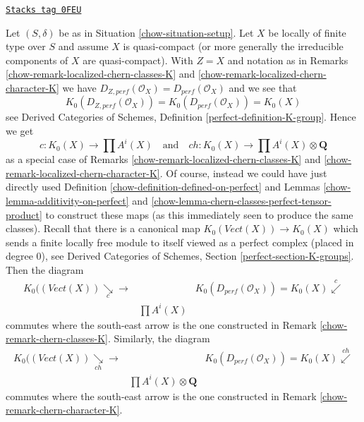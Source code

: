 \begin{remark}
\label{chow-remark-chern-classes-agree}
\href{https://stacks.math.columbia.edu/tag/0FEU}{\texttt{Stacks tag 0FEU}}

Let $(S, \delta)$ be as in Situation \ref{chow-situation-setup}.
Let $X$ be locally of finite type over $S$ and assume $X$
is quasi-compact (or more generally the irreducible components
of $X$ are quasi-compact). With $Z = X$ and notation as in
Remarks \ref{chow-remark-localized-chern-classes-K} and
\ref{chow-remark-localized-chern-character-K}
we have $D_{Z, perf}(\mathcal{O}_X) = D_{perf}(\mathcal{O}_X)$
and we see that
$$
K_0(D_{Z, perf}(\mathcal{O}_X)) = K_0(D_{perf}(\mathcal{O}_X)) = K_0(X)
$$
see
Derived Categories of Schemes, Definition \ref{perfect-definition-K-group}.
Hence we get
$$
c : K_0(X) \to \prod A^i(X)
\quad\text{and}\quad
ch : K_0(X) \to \prod A^i(X) \otimes \mathbf{Q}
$$
as a special case of Remarks \ref{chow-remark-localized-chern-classes-K} and
\ref{chow-remark-localized-chern-character-K}. Of course, instead we could
have just directly used Definition \ref{chow-definition-defined-on-perfect} and
Lemmas \ref{chow-lemma-additivity-on-perfect} and
\ref{chow-lemma-chern-classes-perfect-tensor-product} to construct these maps
(as this immediately seen to produce the same classes).
Recall that there is a canonical map $K_0(\textit{Vect}(X)) \to K_0(X)$
which sends a finite locally free module to itself viewed
as a perfect complex (placed in degree $0$), see
Derived Categories of Schemes, Section \ref{perfect-section-K-groups}.
Then the diagram
$$
\begin{array}{ccc}K_0((\textit{Vect}(X)) \underset{c}{\searrow}\longrightarrow &  & K_0(D_{perf}(\mathcal{O}_X)) = K_0(X) \overset{c}{\swarrow} \\  & \prod A^i(X) & \end{array}
$$
commutes where the south-east arrow is the one constructed in
Remark \ref{chow-remark-chern-classes-K}. Similarly, the diagram
$$
\begin{array}{ccc}K_0((\textit{Vect}(X)) \underset{ch}{\searrow}\longrightarrow &  & K_0(D_{perf}(\mathcal{O}_X)) = K_0(X) \overset{ch}{\swarrow} \\  & \prod A^i(X) \otimes \mathbf{Q} & \end{array}
$$
commutes where the south-east arrow is the one constructed in
Remark \ref{chow-remark-chern-character-K}.
\end{remark}

